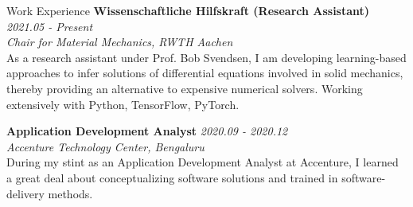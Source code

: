 \documentclass{resume}
\begin{document}
\begin{rSection}{Work Experience}
{\bf Wissenschaftliche Hilfskraft (Research Assistant)} \hfill {\em 2021.05 - Present}\\
{\em Chair for Material Mechanics, RWTH Aachen}\\
As a research assistant under Prof. Bob Svendsen, I am developing learning-based approaches to infer solutions of differential equations involved in solid mechanics, thereby providing an alternative to expensive numerical solvers. Working extensively with Python, TensorFlow, PyTorch.

{\bf Application Development Analyst} \hfill {\em 2020.09 - 2020.12}\\
{\em Accenture Technology Center, Bengaluru}\\
During my stint as an Application Development Analyst at Accenture, I learned a great deal about conceptualizing software solutions and trained in software-delivery methods.
\end{rSection}
\end{document}

